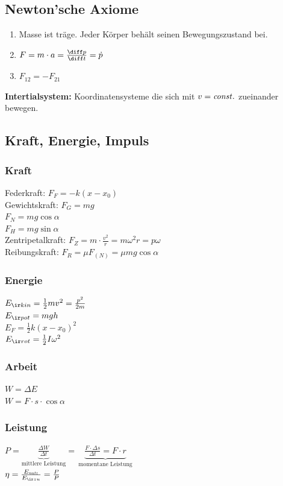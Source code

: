 \documentclass[german]{latex4ei/latex4ei_sheet}
\begin{document}
\begin{sectionbox}
\subsection{Newton'sche Axiome}
\begin{enumerate}
	\item Masse ist träge. Jeder Körper behält seinen Bewegungszustand bei.
	\item $F=m\cdot a=\frac{\diff p}{\diff t}=\dot{p}$
	\item $F_{12}=-F_{21}$
\end{enumerate}
\textbf{Intertialsystem:} Koordinatensysteme die sich mit $v=\it const.$ zueinander bewegen.
\end{sectionbox}
\subsection{Kraft, Energie, Impuls}
\subsubsection{Kraft}
Federkraft: $F_F=-k(x-x_0)$ \\
Gewichtskraft: $F_G=mg$ \\
$F_N=mg\cos \alpha$ \\
$F_H=mg\sin \alpha$ \\
Zentripetalkraft: $F_Z=m\cdot \frac{v^2}{r}=m\omega^2r=p\omega$ \\
Reibungskraft: $F_R=\mu F_{(N)}=\mu m g \cos \alpha$
\subsubsection{Energie}
$E_{\ir kin}=\frac{1}{2}mv^2=\frac{p^2}{2m}$\\
$E_{\ir pot}=mgh$\\
$E_{F}=\frac{1}{2}k(x-x_0)^2$\\
$E_{\ir rot}=\frac{1}{2}I\omega^2$
\subsubsection{Arbeit}
$W=\Delta E$\\
$W=F\cdot s \cdot \cos \alpha$
\subsubsection{Leistung}
$P=
\underbrace{\frac{\Delta W}{\Delta t}}_{\text{mittlere Leistung}} 
= \, \underbrace{\frac{F\cdot \Delta s}{\Delta t}=F\cdot r}_{\text{momentane Leistung}}$\\
$\eta=\frac{E_{\it nutz}}{E_{\ir zu}}=\frac{P}{P}$
\end{document}
